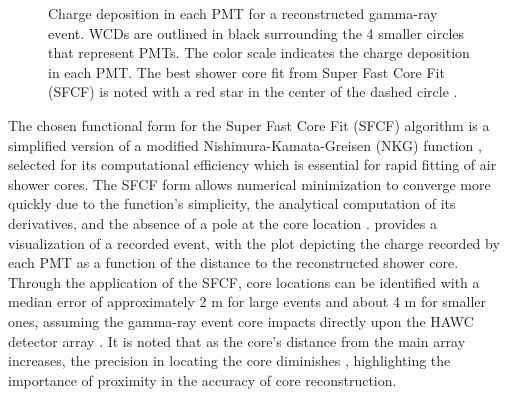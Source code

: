 \begin{figure}
    \caption{Charge deposition in each PMT for a reconstructed gamma-ray event. WCDs are outlined in black surrounding the 4 smaller circles that represent PMTs. The color scale indicates the charge deposition in each PMT. The best shower core fit from Super Fast Core Fit (SFCF) is noted with a red star in the center of the dashed circle \cite{Abeysekara_2017}.}
    \label{fig:core_fitter}
\end{figure}

The chosen functional form for the Super Fast Core Fit (SFCF) algorithm is a simplified version of a modified Nishimura-Kamata-Greisen (NKG) function \cite{cosmic_ray_shape}, selected for its computational efficiency which is essential for rapid fitting of air shower cores.
The SFCF form allows numerical minimization to converge more quickly due to the function's simplicity, the analytical computation of its derivatives, and the absence of a pole at the core location \cite{Abeysekara_2017}.
 provides a visualization of a recorded event, with the plot depicting the charge recorded by each PMT as a function of the distance to the reconstructed shower core.
Through the application of the SFCF, core locations can be identified with a median error of approximately 2 m for large events and about 4 m for smaller ones, assuming the gamma-ray event core impacts directly upon the HAWC detector array \cite{Abeysekara_2017}.
It is noted that as the core's distance from the main array increases, the precision in locating the core diminishes \cite{Abeysekara_2017}, highlighting the importance of proximity in the accuracy of core reconstruction.


